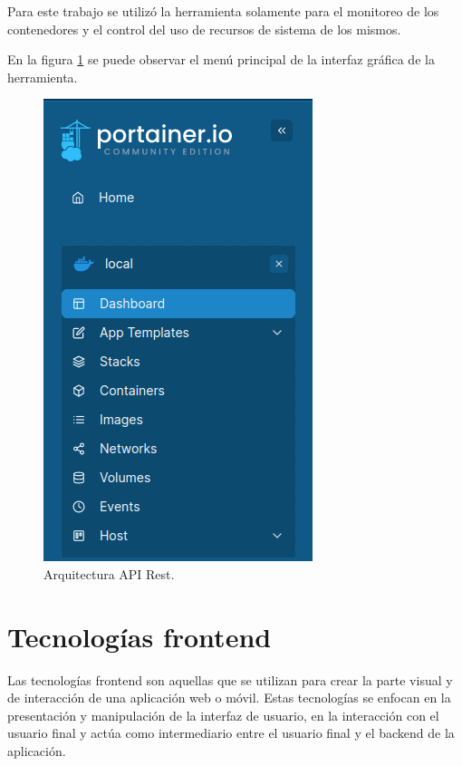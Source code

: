 Para este trabajo se utilizó la herramienta solamente para el monitoreo de los contenedores y el control del uso de recursos de sistema de los mismos.

En la figura \ref{fig:portainer1} se puede observar el menú principal de la interfaz gráfica de la herramienta.

\begin{figure}[H]
	\centering
	\includegraphics[scale=.50]{./Figures/portainer-admin-1.png}
	\caption{Arquitectura API Rest.}
	\label{fig:portainer1}
\end{figure}

\section{Tecnologías frontend}
\label{sec:frontend}

Las tecnologías frontend son aquellas que se utilizan para crear la parte visual y de interacción de una aplicación web o móvil. Estas tecnologías se enfocan en la presentación y manipulación de la interfaz de usuario, en la interacción con el usuario final y actúa como intermediario entre el usuario final y el backend de la aplicación.

